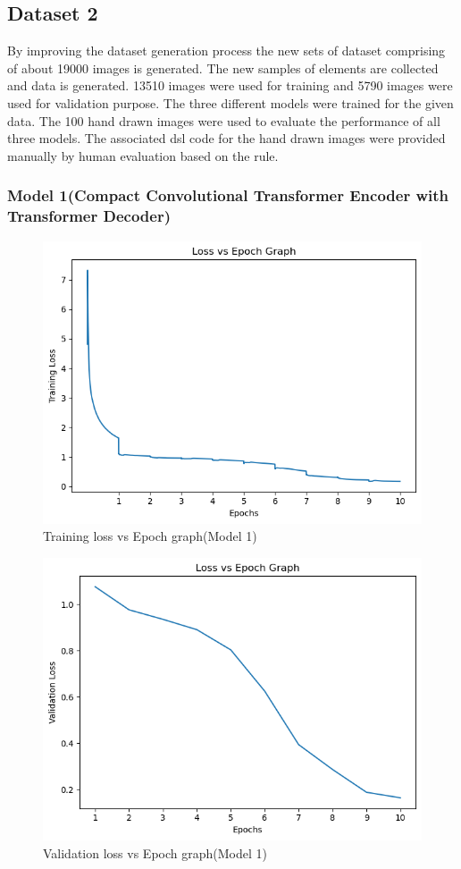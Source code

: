 \subsection{Dataset 2}
By improving the dataset generation process the new sets of dataset comprising of about 19000 images is generated. The new samples of elements are collected and data is generated.  13510 images were used for training and 5790 images were used for validation purpose. The three different models were trained for the given data. The 100 hand drawn images were used to evaluate the performance of all three models. The associated dsl code for the hand drawn images were provided manually by human evaluation based on the rule.
\subsubsection{Model 1(Compact Convolutional Transformer Encoder with Transformer Decoder)}
\begin{figure}[H]
    \includegraphics[scale=.8]{images/tl1.png}
    \centering
    \caption{Training loss vs Epoch graph(Model 1)}
    \label{fig:cctewtd}
\end{figure}
\begin{figure}[H]
    \includegraphics[scale=.8]{images/vl1.png}
    \centering
    \caption{Validation loss vs Epoch graph(Model 1)}
    \label{fig:cctewtdv}
\end{figure}
